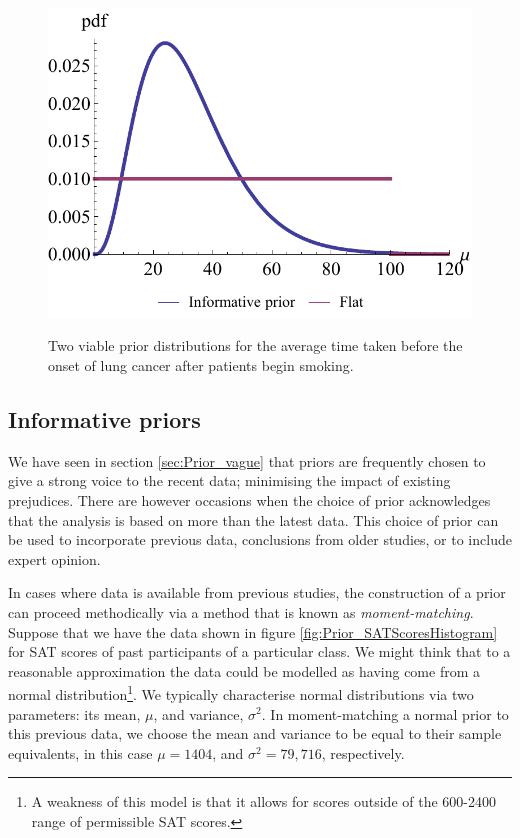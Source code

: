 \documentclass[11pt,fullpage]{book}
\begin{document}
\begin{figure}
\centering
\scalebox{0.75} 
{\includegraphics{Prior_lungcancerFlatandGammaPriors.pdf}}\caption{Two viable prior distributions for the average time taken before the onset of lung cancer after patients begin smoking.}\label{fig:Prior_lungcancerFlatandGammaPriors}
\end{figure}

\subsection{Informative priors}
We have seen in section \ref{sec:Prior_vague} that priors are frequently chosen to give a strong voice to the recent data; minimising the impact of existing prejudices. There are however occasions when the choice of prior acknowledges that the analysis is based on more than the latest data. This choice of prior can be used to incorporate previous data, conclusions from older studies, or to include expert opinion. 

In cases where data is available from previous studies, the construction of a prior can proceed methodically via a method that is known as \textit{moment-matching}. Suppose that we have the data shown in figure \ref{fig:Prior_SATScoresHistogram} for SAT scores of past participants of a particular class. We might think that to a reasonable approximation the data could be modelled as having come from a normal distribution\footnote{A weakness of this model is that it allows for scores outside of the 600-2400 range of permissible SAT scores.}. We typically characterise normal distributions via two parameters: its mean, $\mu$, and variance, $\sigma^2$. In moment-matching a normal prior to this previous data, we choose the mean and variance to be equal to their sample equivalents, in this case $\mu=1404$, and $\sigma^2 = 79,716$, respectively.
\end{document}
